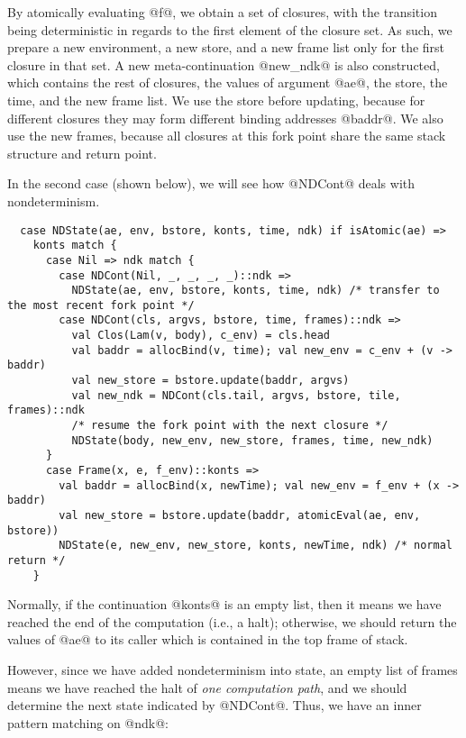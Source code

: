 \documentclass[acmsmall, review]{acmart}\settopmatter{}
\begin{document}
By atomically evaluating @f@, we obtain a set of closures, with the transition being 
deterministic in regards to the first element of the closure set.
As such, we prepare a new environment, a new store, and a new frame list only for the
first closure in that set. A new meta-continuation @new_ndk@ is also constructed,
which contains the rest of closures, the values of argument @ae@, the store, the time,
and the new frame list. We use the store before updating, because for different closures
they may form different binding addresses @baddr@. We also use the new frames, because
all closures at this fork point share the same stack structure and return point.

In the second case (shown below), we will see how @NDCont@ deals with nondeterminism.

\begin{lstlisting}
  case NDState(ae, env, bstore, konts, time, ndk) if isAtomic(ae) =>
    konts match {
      case Nil => ndk match {
        case NDCont(Nil, _, _, _, _)::ndk =>
          NDState(ae, env, bstore, konts, time, ndk) /* transfer to the most recent fork point */
        case NDCont(cls, argvs, bstore, time, frames)::ndk =>
          val Clos(Lam(v, body), c_env) = cls.head
          val baddr = allocBind(v, time); val new_env = c_env + (v -> baddr)
          val new_store = bstore.update(baddr, argvs)
          val new_ndk = NDCont(cls.tail, argvs, bstore, tile, frames)::ndk
          /* resume the fork point with the next closure */
          NDState(body, new_env, new_store, frames, time, new_ndk)
      }
      case Frame(x, e, f_env)::konts =>
        val baddr = allocBind(x, newTime); val new_env = f_env + (x -> baddr)
        val new_store = bstore.update(baddr, atomicEval(ae, env, bstore))
        NDState(e, new_env, new_store, konts, newTime, ndk) /* normal return */
    }
\end{lstlisting}

Normally, if the continuation @konts@ is an empty list, then it means we have reached
the end of the computation (i.e., a halt); otherwise, we should return the values of 
@ae@ to its caller which is contained in the top frame of stack.

However, since we have added nondeterminism into state, an empty list of frames means
we have reached the halt of \textit{one computation path}, and we should determine the
next state indicated by @NDCont@. Thus, we have an inner pattern matching on @ndk@:
\end{document}
